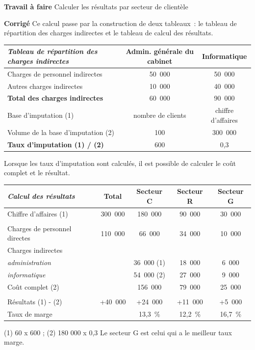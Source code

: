 \documentclass[oneside]{kaobook}
\begin{document}
\textbf{Travail à faire}
Calculer les résultats par secteur de clientèle

\textbf{Corrigé}
Ce calcul passe par la construction de deux tableaux : le tableau de répartition des charges indirectes et le tableau de calcul des résultats.
\begin{center}
\sidenotesize
\begin{tabular}{l c c}
\emph{Tableau de répartition des charges indirectes} & Admin. générale du cabinet & Informatique\\
\hline
Charges de personnel indirectes & 50 000 & 50 000\\
Autres charges indirectes & 10 000 & 40 000\\
\textbf{Total des charges indirectes} & 60 000 & 90 000\\
Base d'imputation (1) & nombre de clients & chiffre d'affaires\\
Volume de la base d'imputation (2) & 100 & 300 000\\
\textbf{Taux d'imputation (1) / (2)} & 600 & 0,3\\
\end{tabular}
\end{center}

Lorsque les taux d'imputation sont calculés, il est possible de calculer le coût complet et le résultat.
\begin{center}
\sidenotesize
\begin{tabular}{l c c c c}
\emph{Calcul des résultats} & Total & Secteur C & Secteur R & Secteur G\\
\hline
Chiffre d'affaires (1) & 300 000 & 180 000 & 90 000 & 30 000\\
 &  &  &  & \\
Charges de personnel directes & 110 000 & 66 000 & 34 000 & 10 000\\
Charges indirectes &  &  &  & \\
\emph{administration} &  & 36 000 (1) & 18 000 & 6 000\\
\emph{informatique} &  & 54 000 (2) & 27 000 & 9 000\\
Coût complet (2) &  & 156 000 & 79 000 & 25 000\\
 &  &  &  & \\
Résultats (1) - (2) & +40 000 & +24 000 & +11 000 & +5 000\\
Taux de marge &  & 13,3 \% & 12,2 \% & 16,7 \%\\
\end{tabular}
\end{center}
(1) 60 x 600 ; (2) 180 000 x 0,3
Le secteur G est celui qui a le meilleur taux marge.
\end{document}
